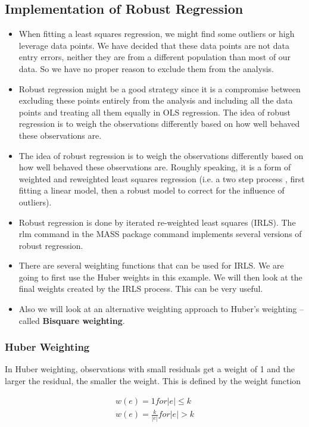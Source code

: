 \documentclass[12pt, a4paper]{article}
\theoremstyle{plain}
\theoremstyle{definition}
\theoremstyle{remark}
\begin{document}
\subsection{Implementation of Robust Regression}
\begin{itemize}
\item When fitting a least squares regression, we might find some outliers or high leverage data points.  We have decided that these data points are not data entry errors, neither they are from a different population than most of our data. So we have no proper reason to exclude them from the analysis.  

\item Robust regression might be a good strategy since it is a compromise between excluding these points entirely from the analysis and including all the data points and treating all them equally in OLS regression. The idea of robust regression is to weigh the observations differently based on how well behaved these observations are.

\item 
The idea of robust regression is to weigh the observations differently based on how well behaved these observations are. Roughly speaking, it is a form of weighted and reweighted least squares regression (i.e. a two step process , first fitting a linear model, then a robust model to correct for the influence of outliers).
\item 
Robust regression is done by iterated re-weighted least squares (IRLS). The rlm command in the MASS package command implements several versions of robust regression.
\item 
There are several weighting functions that can be used for IRLS. We are going to first use the Huber weights in this example. We will then look at the final weights created by the IRLS process. This can be very useful. 
\item 
Also we will look at an alternative weighting approach to Huber’s weighting – called \textbf{Bisquare weighting}. 
\end{itemize}
\subsubsection{Huber Weighting}
In Huber weighting, observations with small residuals get a weight of 1 and the larger the residual, the smaller the weight. This is defined by the weight function


\begin{eqnarray}
w(e) = 1 for |e| \leq k  \\
w(e) = \frac{k}{|e|} for |e| > k
\end{eqnarray}
\end{document}
